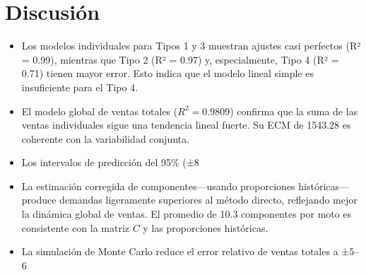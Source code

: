 \documentclass[12pt,a4paper]{article}
\begin{document}
\section{Discusión}
\begin{itemize}\small
    \item Los modelos individuales para Tipos 1 y 3 muestran ajustes casi perfectos (R² = 0.99), mientras que Tipo 2 (R² = 0.97) y, especialmente, Tipo 4 (R² = 0.71) tienen mayor error. Esto indica que el modelo lineal simple es insuficiente para el Tipo 4.
    \item El modelo global de ventas totales ($R^2 = 0.9809$) confirma que la suma de las ventas individuales sigue una tendencia lineal fuerte. Su ECM de 1543.28 es coherente con la variabilidad conjunta.
    \item Los intervalos de predicción del 95\% (±8 %
    \item La estimación corregida de componentes—usando proporciones históricas—produce demandas ligeramente superiores al método directo, reflejando mejor la dinámica global de ventas. El promedio de 10.3 componentes por moto es consistente con la matriz $C$ y las proporciones históricas.
    \item La simulación de Monte Carlo reduce el error relativo de ventas totales a ±5–6 %
\end{itemize}
\end{document}
